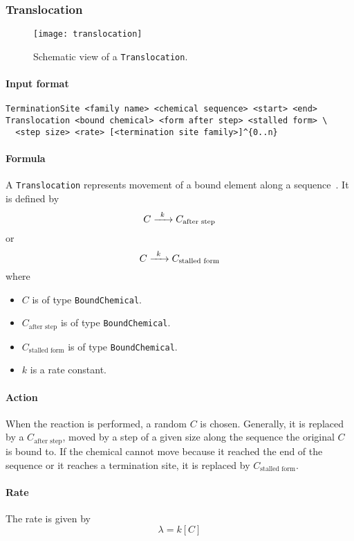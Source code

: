 \subsubsection{Translocation}

\begin{figure}[!h]
  \centering
  \texttt{[image: translocation]}
  \caption{Schematic view of a \texttt{Translocation}.}
  \label{fig:translocation}
\end{figure}

\paragraph{Input format}
\begin{verbatim}
TerminationSite <family name> <chemical sequence> <start> <end>
Translocation <bound chemical> <form after step> <stalled form> \
  <step size> <rate> [<termination site family>]^{0..n}
\end{verbatim}

\paragraph{Formula} A \texttt{Translocation} represents movement of a bound element along a sequence~. It is defined by
\[
	\reactionIrr{C}{C_\text{after step}}{k}{}
\]
or
\[
	\reactionIrr{C}{C_\text{stalled form}}{k}{}
\]
where
\begin{itemize}
	\item $C$ is of type \texttt{BoundChemical}.
	\item $C_\text{after step}$ is of type \texttt{BoundChemical}.
	\item $C_\text{stalled form}$ is of type \texttt{BoundChemical}.
	\item $k$ is a rate constant.
\end{itemize}

\paragraph{Action} When the reaction is performed, a random $C$ is chosen. Generally, it is replaced by a $C_\text{after step}$, moved by a step of a given size along the sequence the original $C$ is bound to. If the chemical cannot move because it reached the end of the sequence or it reaches a termination site, it is replaced by $C_\text{stalled form}$.

\paragraph{Rate} The rate is given by
\[
	\lambda = k [C]
\]

